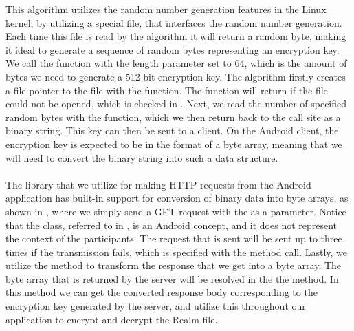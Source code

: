 
\FloatBarrier
{}

This algorithm utilizes the random number generation features in the Linux kernel, by utilizing a special file,  that interfaces the random number generation. Each time this file is read by the algorithm it will return a random byte, making it ideal to generate a sequence of random bytes representing an encryption key. We call the function with the length parameter set to 64, which is the amount of bytes we need to generate a 512 bit encryption key. The algorithm firstly creates a file pointer to the  file with the  function. The function will return  if the file could not be opened, which is checked in . Next, we read the number of specified random bytes with the  function, which we then return back to the call site as a binary string. This key can then be sent to a client. On the Android client, the encryption key is expected to be in the format of a byte array, meaning that we will need to convert the binary string into such a data structure. 
\\\\
The library that we utilize for making HTTP requests from the Android application has built-in support for conversion of binary data into byte arrays, as shown in , where we simply send a GET request with the  as a parameter. Notice that the  class, referred to in , is an Android concept, and it does not represent the context of the participants. The request that is sent will be sent up to three times if the transmission fails, which is specified with the  method call. Lastly, we utilize the  method to transform the response that we get into a byte array. The byte array that is returned by the server will be resolved in the the  method. In this method we can get the converted response body corresponding to the encryption key generated by the server, and utilize this throughout our application to encrypt and decrypt the Realm file.


\FloatBarrier

